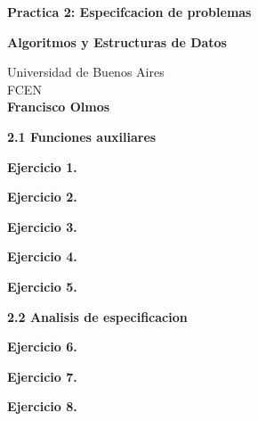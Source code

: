 \documentclass[12pt]{report}
\begin{document}
\begin{titlepage}
    \begin{center}
        \vspace*{1cm}
        
        \Huge
        \textbf{Practica 2: Especifcacion de problemas}
        \vspace{0.5cm}
        \LARGE

        \vfill
        \textbf{Algoritmos y Estructuras de Datos}
        

        
        \vfill

        
        \vspace{0.8cm}
        
        \Large
        Universidad de Buenos Aires \\
        FCEN \\
        \textbf{Francisco Olmos}
        
    \end{center}
\end{titlepage}


\textbf{2.1 Funciones auxiliares}

\vspace{0.8cm}
\textbf{Ejercicio 1.} 
\vspace{0.8cm}

\vspace{0.8cm}
\textbf{Ejercicio 2.} 
\vspace{0.8cm}

\vspace{0.8cm}
\textbf{Ejercicio 3.} 
\vspace{0.8cm}

\vspace{0.8cm}
\textbf{Ejercicio 4.} 
\vspace{0.8cm}

\vspace{0.8cm}
\textbf{Ejercicio 5.} 
\vspace{0.8cm}



\textbf{2.2 Analisis de especificacion}

\vspace{0.8cm}
\textbf{Ejercicio 6.} 
\vspace{0.8cm}

\vspace{0.8cm}
\textbf{Ejercicio 7.} 
\vspace{0.8cm}

\vspace{0.8cm}
\textbf{Ejercicio 8.} 
\vspace{0.8cm}
\end{document}
